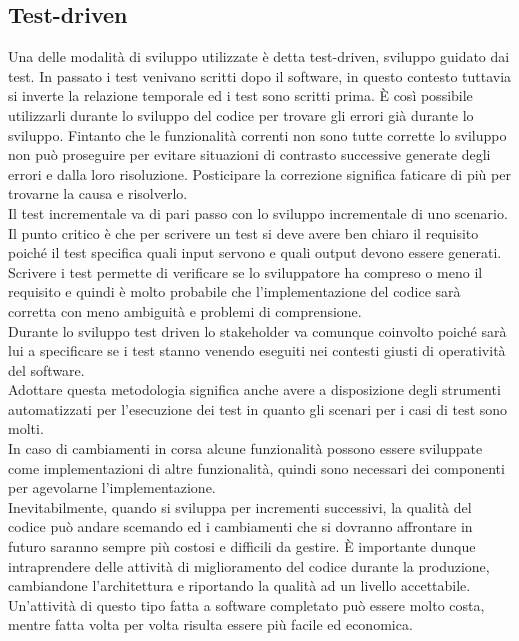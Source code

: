 \subsection{Test-driven}
Una delle modalità di sviluppo utilizzate è detta test-driven, sviluppo guidato dai test.
In passato i test venivano scritti dopo il software, in questo contesto tuttavia si inverte la relazione temporale ed i test sono scritti prima.
È così possibile utilizzarli durante lo sviluppo del codice per trovare gli errori già durante lo sviluppo.
Fintanto che le funzionalità correnti non sono tutte corrette lo sviluppo non può proseguire per evitare situazioni di contrasto successive generate degli errori e dalla loro risoluzione.
Posticipare la correzione significa faticare di più per trovarne la causa e risolverlo.\\
Il test incrementale va di pari passo con lo sviluppo incrementale di uno scenario.
Il punto critico è che per scrivere un test si deve avere ben chiaro il requisito poiché il test specifica quali input servono e quali output devono essere generati.
Scrivere i test permette di verificare se lo sviluppatore ha compreso o meno il requisito e quindi è molto probabile che l'implementazione del codice sarà corretta con meno ambiguità e problemi di comprensione.\\
Durante lo sviluppo test driven lo stakeholder va comunque coinvolto poiché sarà lui a specificare se i test stanno venendo eseguiti nei contesti giusti di operatività del software.\\
Adottare questa metodologia significa anche avere a disposizione degli strumenti automatizzati per l'esecuzione dei test in quanto gli scenari per i casi di test sono molti.\\
In caso di cambiamenti in corsa alcune funzionalità possono essere sviluppate come implementazioni di altre funzionalità, quindi sono necessari dei componenti per agevolarne l'implementazione.\\
Inevitabilmente, quando si sviluppa per incrementi successivi, la qualità del codice può andare scemando ed i cambiamenti che si dovranno affrontare in futuro saranno sempre più costosi e difficili da gestire.
È importante dunque intraprendere delle attività di miglioramento del codice durante la produzione, cambiandone l'architettura e riportando la qualità ad un livello accettabile.
Un'attività di questo tipo fatta a software completato può essere molto costa, mentre fatta volta per volta risulta essere più facile ed economica.\\


